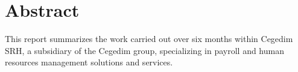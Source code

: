 {}
\noindent \section*{Abstract}
\vspace{0.25cm}
This report summarizes the work carried out over six months within Cegedim SRH, a subsidiary of the Cegedim group, specializing in payroll and human resources management solutions and services.
\newpage
